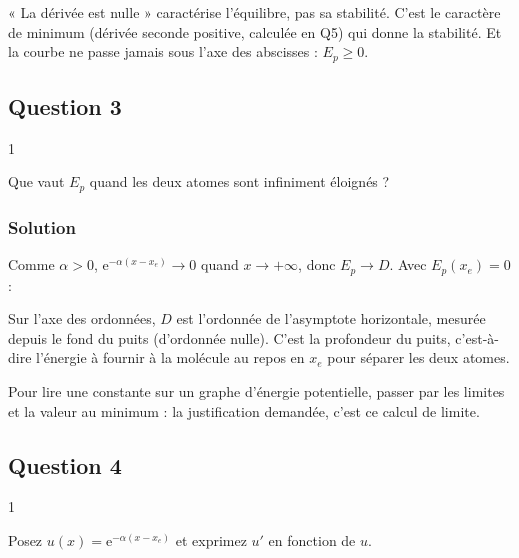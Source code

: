 \documentclass[11pt,a4paper]{article}
\newcommand{\equationajustee}[1]{%
  \sbox{\boiteequation}{$\displaystyle #1$}%
  \ifdim\wd\boiteequation>\linewidth
    \[\resizebox{\linewidth}{!}{\usebox{\boiteequation}}\]%
  \else
    \[#1\]%
  \fi}
\begin{document}
\begin{piege}

« La dérivée est nulle » caractérise l'équilibre, pas sa stabilité. C'est le caractère de minimum (dérivée seconde positive, calculée en Q5) qui donne la stabilité. Et la courbe ne passe jamais sous l'axe des abscisses : \(E_p \ge 0\).

\end{piege}

\hypertarget{question-3}{%
\subsection{Question 3}\label{question-3}}

\begin{indication}{1}

Que vaut \(E_p\) quand les deux atomes sont infiniment éloignés ?

\end{indication}

\hypertarget{solution-2}{%
\subsubsection{Solution}\label{solution-2}}

Comme \(\alpha > 0\), \({\mathrm{e}}^{-\alpha(x - x_e)} \to 0\) quand \(x \to +\infty\), donc \(E_p \to D\). Avec \(E_p(x_e) = 0\) :

\equationajustee{\boxed{D = \lim_{x\to+\infty} E_p(x) - E_p(x_e)}}

Sur l'axe des ordonnées, \(D\) est l'ordonnée de l'asymptote horizontale, mesurée depuis le fond du puits (d'ordonnée nulle). C'est la profondeur du puits, c'est-à-dire l'énergie à fournir à la molécule au repos en \(x_e\) pour séparer les deux atomes.

\begin{methode}

Pour lire une constante sur un graphe d'énergie potentielle, passer par les limites et la valeur au minimum : la justification demandée, c'est ce calcul de limite.

\end{methode}

\hypertarget{question-4}{%
\subsection{Question 4}\label{question-4}}

\begin{indication}{1}

Posez \(u(x) = {\mathrm{e}}^{-\alpha(x - x_e)}\) et exprimez \(u'\) en fonction de \(u\).

\end{indication}
\end{document}
